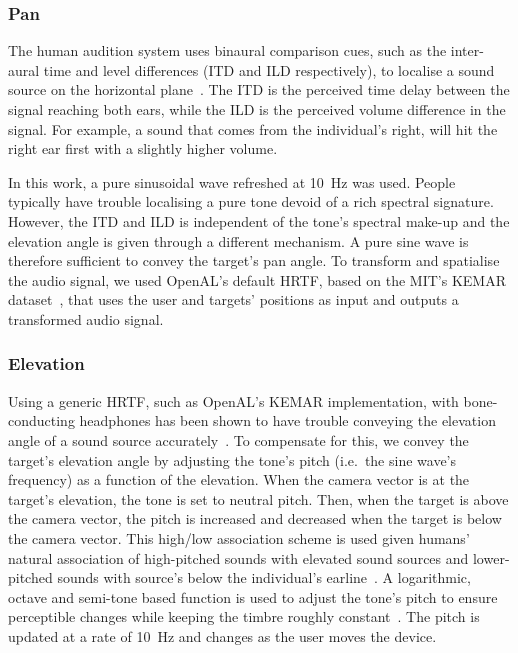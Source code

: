 \documentclass{llncs}
\begin{document}
\subsubsection{Pan}

The human audition system uses binaural comparison cues, such as the inter-aural time and level differences (ITD and ILD respectively), to localise a sound source on the horizontal plane~\cite{blauert1969sound}.
The ITD is the perceived time delay between the signal reaching both ears, while the ILD is the perceived volume difference in the signal.
For example, a sound that comes from the individual's right, will hit the right ear first with a slightly higher volume.

In this work, a pure sinusoidal wave refreshed at \SI{10}{\hertz} was used. 
People typically have trouble localising a pure tone devoid of a rich spectral signature.
However, the ITD and ILD is independent of the tone's spectral make-up and the elevation angle is given through a different mechanism.
A pure sine wave is therefore sufficient to convey the target's pan angle.
To transform and spatialise the audio signal, we used OpenAL's default HRTF, based on the MIT's KEMAR dataset~\cite{hiebert2005openal,gardner1995hrtf}, that uses the user and targets' positions as input and outputs a transformed audio signal.

\subsubsection{Elevation}

Using a generic HRTF, such as OpenAL's KEMAR implementation, with bone-conducting headphones has been shown to have trouble conveying the elevation angle of a sound source accurately~\cite{macdonald2006spatial,schonstein2008comparison}.
To compensate for this, we convey the target's elevation angle by adjusting the tone's pitch (i.e.\ the sine wave's frequency) as a function of the elevation. 
When the camera vector is at the target's elevation, the tone is set to neutral pitch.
Then, when the target is above the camera vector, the pitch is increased and decreased when the target is below the camera vector.
This high/low association scheme is used given humans' natural association of high-pitched sounds with elevated sound sources and lower-pitched sounds with source's below the individual's earline~\cite{pratt1930spatial,blauert1997spatial}.
A logarithmic, octave and semi-tone based function is used to adjust the tone's pitch to ensure perceptible changes while keeping the timbre roughly constant~\cite{shepard1964circularity}.
The pitch is updated at a rate of \SI{10}{\hertz} and changes as the user moves the device.
\end{document}
